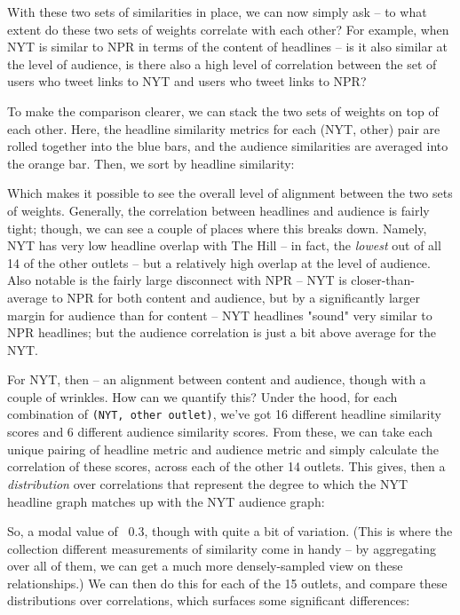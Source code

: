 \documentclass{scrartcl}
\begin{document}

With these two sets of similarities in place, we can now simply ask -- to what extent do these two sets of weights correlate with each other? For example, when NYT is similar to NPR in terms of the content of headlines -- is it also similar at the level of audience, is there also a high level of correlation between the set of users who tweet links to NYT and users who tweet links to NPR?

To make the comparison clearer, we can stack the two sets of weights on top of each other. Here, the headline similarity metrics for each (NYT, other) pair are rolled together into the blue bars, and the audience similarities are averaged into the orange bar. Then, we sort by headline similarity:


Which makes it possible to see the overall level of alignment between the two sets of weights. Generally, the correlation between headlines and audience is fairly tight; though, we can see a couple of places where this breaks down. Namely, NYT has very low headline overlap with The Hill -- in fact, the \textit{lowest} out of all 14 of the other outlets -- but a relatively high overlap at the level of audience. Also notable is the fairly large disconnect with NPR -- NYT is closer-than-average to NPR for both content and audience, but by a significantly larger margin for audience than for content -- NYT headlines "sound" very similar to NPR headlines; but the audience correlation is just a bit above average for the NYT.

For NYT, then -- an alignment between content and audience, though with a couple of wrinkles. How can we quantify this? Under the hood, for each combination of \texttt{(NYT, other outlet)}, we've got 16 different headline similarity scores and 6 different audience similarity scores. From these, we can take each unique pairing of headline metric and audience metric and simply calculate the correlation of these scores, across each of the other 14 outlets. This gives, then a \textit{distribution} over correlations that represent the degree to which the NYT headline graph matches up with the NYT audience graph:


So, a modal value of ~0.3, though with quite a bit of variation. (This is where the collection different measurements of similarity come in handy -- by aggregating over all of them, we can get a much more densely-sampled view on these relationships.) We can then do this for each of the 15 outlets, and compare these distributions over correlations, which surfaces some significant differences:
\end{document}
